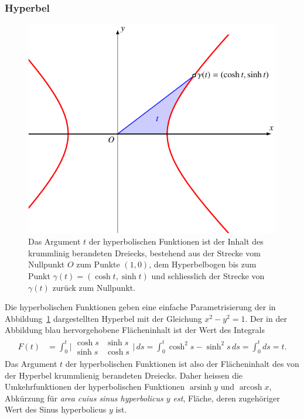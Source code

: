 \subsubsection{Hyperbel}
\begin{figure}
\centering
\includegraphics{chapters/030-geometrie/images/hyperbelflaeche.pdf}
\caption{Das Argument $t$ der hyperbolischen Funktionen ist der Inhalt
des krummlinig berandeten Dreiecks, bestehend aus der Strecke 
vom Nullpunkt $O$ zum Punkte $(1,0)$, dem Hyperbelbogen bis zum
Punkt $\gamma(t)=(\cosh t,\sinh t)$ und schliesslich der Strecke
von $\gamma(t)$ zurück zum Nullpunkt.
\label{buch:geometrie:fig:hyperbelflaeche}}
\end{figure}
Die hyperbolischen Funktionen geben eine einfache Parametrisierung
der in Abbildung~\ref{buch:geometrie:fig:hyperbelflaeche}
dargestellten Hyperbel mit der Gleichung
\(
x^2-y^2=1
\).
Der in der Abbildung blau hervorgehobene Flächeninhalt ist der Wert
des Integrals
\begin{align*}
F(t)
&=
\int_0^t
\biggl|
\begin{matrix}
\cosh s&\sinh s\\
\sinh s&\cosh s
\end{matrix}
\biggr|
\,ds
=
\int_0^t
\cosh^2s-\sinh^2s\,ds
=
\int_0^t ds = t.
\end{align*}
Das Argument $t$ der hyperbolischen Funktionen ist also der Flächeninhalt
des von der Hyperbel krummlienig berandeten Dreiecks.
Daher heissen die Umkehrfunktionen der hyperbolischen Funktionen
$\operatorname{arsinh}y$ und $\operatorname{arcosh}x$, Abkürzung
für {\em area cuius sinus hyperbolicus $y$ est}, Fläche, deren zugehöriger
Wert des Sinus hyperbolicus $y$ ist.


